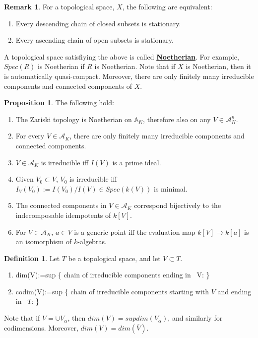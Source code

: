 \documentclass{article}
\theoremstyle{definition}
\theoremstyle{definition}
\newtheorem{definition}{Definition}[theorem]
\theoremstyle{definition}
\newtheorem{remark}{Remark}[theorem]
\theoremstyle{definition}
\newtheorem{proposition}{Proposition}[theorem]
\theoremstyle{definition}
\theoremstyle{definition}
\theoremstyle{definition}
\begin{document}
\begin{tcolorbox}[colback=green!5!white,colframe=green!30!white]
\begin{remark}
For a topological space, $X$, the following are equivalent:
\begin{enumerate}
    \item Every descending chain of closed subsets is stationary. 
    \item Every ascending chain of open subsets is stationary.
\end{enumerate}
A topological space satisfiying the above is called \underline{\textbf{Noetherian}}. For example, $Spec(R)$ is Noetherian if $R$ is Noetherian. Note that if $X$ is Noetherian, then it is automatically quasi-compact. Moreover, there are only finitely many irreducible components and connected components of $X$. 
\end{remark}
\end{tcolorbox}


\begin{tcolorbox}[colback=blue!5!white,colframe=blue!30!white]
\begin{proposition}
The following hold:
\begin{enumerate}
    \item The Zariski topology is Noetherian on $\mathbb{A}_K$, therefore also on any $V\in \mathcal{A}_K^n$. 
    \item For every $V\in \mathcal{A}_K$, there are only finitely many irreducible components and connected components. 
    \item $V\in \mathcal{A}_K$ is irreducible iff $I(V)$ is a prime ideal. 
    \item Given $V_0\subset V$, $V_0$ is irreducible iff $I_V(V_0):=I(V_0)/I(V)\in Spec(k(V))$ is minimal. 
    \item The connected components in $V\in \mathcal{A}_K$ correspond bijectively to the indecomposable idempotents of $k[V]$. 
    \item  For $V\in \mathcal{A}_K$, $a\in V$ is a generic point iff the evaluation map $k[V]\to k[a]$ is an isomorphism of $k$-algebras. 
\end{enumerate}
\end{proposition}
\end{tcolorbox}



\begin{tcolorbox}[colback=purple!5!white,colframe=purple!75!black]
\begin{definition}
Let $T$ be a topological space, and let $V\subset T$.
\begin{enumerate}
    \item dim(V):=sup \{ \textrm{chain of irreducible components ending in }\ V: \}
    \item codim(V):=sup \{ \textrm{chain of irreducible components starting with $V$ and ending in }\ $T$: \}
\end{enumerate}
Note that if $V=\cup V_{\alpha}$, then $dim(V)=supdim(V_{\alpha})$, and similarly for codimensions. Moreover, $dim(V)=dim(\overline{V})$. 
\end{definition}
\end{tcolorbox}
\end{document}
